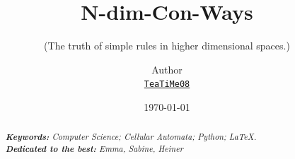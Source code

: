 \documentclass[11pt]{article}
\title{N-dim-Con-Ways}
\subtitle{(The truth of simple rules in higher dimensional spaces.)}
\author{Author\\%
    \href{https://github.com/TeaTiMe08}{\texttt{TeaTiMe08}} %
    }
\date{\today}
\begin{document}
{
\maketitle
\begin{abstract}

\lipsum[1] %

\noindent
\textit{\textbf{Keywords: }%
Computer Science; Cellular Automata; Python; LaTeX.} \\ %
\noindent
\textit{\textbf{Dedicated to the best:}%
Emma, Sabine, Heiner} %

\end{abstract}
}








\medskip



\newpage



\end{document}
